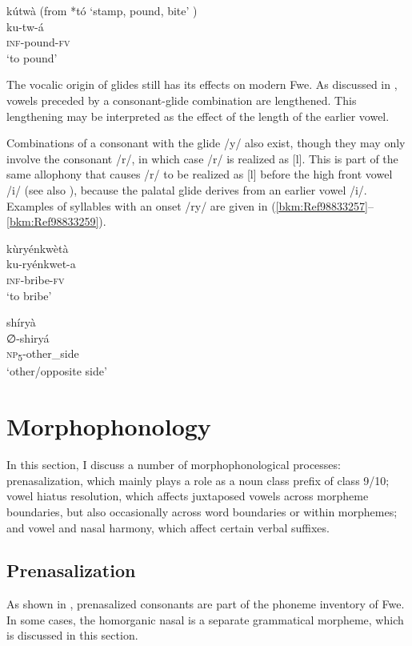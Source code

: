 \ea
\label{bkm:Ref98925813}
    kútwà (from *tó ‘stamp, pound, bite’ \citep{BastinEtAl2002})\\
ku-tw-á\\
\textsc{inf}-pound-\textsc{fv}\\
\glt ‘to pound’
\z

The vocalic origin of glides still has its effects on modern Fwe. As discussed in , vowels preceded by a consonant-glide combination are lengthened. This length\-ening may be interpreted as the effect of the length of the earlier vowel.

Combinations of a consonant with the glide /y/ also exist, though they may only involve the consonant /r/, in which case /r/ is realized as [l]. This is part of the same allophony that causes /r/ to be realized as [l] before the high front vowel /i/ (see also ), because the palatal glide derives from an earlier vowel /i/. Exam\-ples of syllables with an onset /ry/ are given in (\ref{bkm:Ref98833257}--\ref{bkm:Ref98833259}).

\ea
\label{bkm:Ref98833257}
\glll kùryénkwètà\\
ku-ryénkwet-a\\
\textsc{inf}-bribe-\textsc{fv}\\
\glt ‘to bribe’
\z

\ea
\label{bkm:Ref98833259}
\glll shíryà\\
∅-shiryá\\
\textsc{np}\textsubscript{5}-other\_side\\
\glt ‘other/opposite side’
\z
\section{Morphophonology}
\hypertarget{Toc75352611}{}
In this section, I discuss a number of morphophonological processes: prenasalization, which mainly plays a role as a noun class prefix of class 9/10; vowel hiatus resolution, which affects juxtaposed vowels across morpheme boundaries, but also occasionally across word boundaries or within morphemes; and vowel and nasal harmony, which affect certain verbal suffixes.

\largerpage
\subsection{Prenasalization}
\label{bkm:Ref451507060}\hypertarget{Toc75352612}{}
As shown in , prenasalized consonants are part of the phoneme inventory of Fwe. In some cases, the homorganic nasal is a separate grammatical morpheme, which is discussed in this section.

